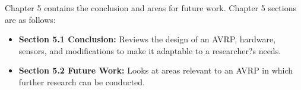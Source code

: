 Chapter 5 contains the conclusion and areas for future work. Chapter 5 sections are as follows:

\begin{itemize}
\item \textbf {Section 5.1 Conclusion:} Reviews the design of an AVRP, hardware, sensors, and modifications to make it adaptable to a researcher?s needs.
\item \textbf {Section 5.2 Future Work:} Looks at areas relevant to an AVRP in which further research can be conducted.
\end{itemize}




%

\vfill

